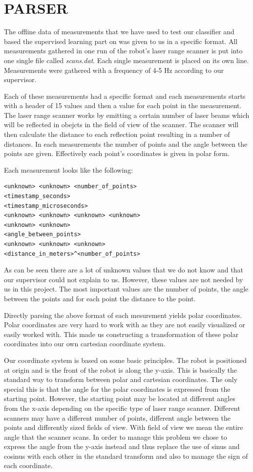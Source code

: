 \documentclass[a4paper, 10pt, conference]{ieeeconf}      %
\begin{document}
\section{PARSER}
The offline data of measurements that we have used to test our classifier and based the supervised learning part on was given to us in a specific format. All measurements gathered in one run of the robot's laser range scanner is put into one single file called \emph{scans.dat}. Each single measurement is placed on its own line. Measurements were gathered with a frequency of 4-5 Hz according to our supervisor.

Each of these measurements had a specific format and each measurements starts with a header of 15 values and then a value for each point in the measurement. The laser range scanner works by emitting a certain number of laser beams which will be reflected in obejcts in the field of view of the scanner. The scanner will then calculate the distance to each reflection point resulting in a number of distances. In each measurements the number of points and the angle between the points are given. Effectively each point's coordinates is given in polar form.

Each measurement looks like the following:

\begin{verbatim}
<unknown> <unknown> <number_of_points>
<timestamp_seconds> 
<timestamp_microseconds>
<unknown> <unknown> <unknown> <unknown>
<unknown> <unknown> 
<angle_between_points>
<unknown> <unknown> <unknown>
<distance_in_meters>^<number_of_points>
\end{verbatim}

As can be seen there are a lot of unknown values that we do not know and that our supervisor could not explain to us. However, these values are not needed by us in this project. The most important values are the number of points, the angle between the points and for each point the distance to the point.

Directly parsing the above format of each mesurement yields polar coordinates. Polar coordinates are very hard to work with as they are not easily visualized or easily worked with. This made us constructing a transformation of these polar coordinates into our own cartesian coordinate system.

Our coordinate system is based on some basic principles. The robot is positioned at origin and is the front of the robot is along the y-axis. This is basically the standard way to transform between polar and cartesian coordinates. The only special this is that the angle for the polar coordinates is expressed from the starting point. However, the starting point may be located at different angles from the x-axis depending on the specific type of laser range scanner. Different scanners may have a different number of points, different angle between the points and differently sized fields of view. With field of view we mean the entire angle that the scanner scans. In order to manage this problem we chose to express the angle from the y-axis instead and thus replace the use of sinus and cosinus with each other in the standard transform and also to manage the sign of each coordinate.
\end{document}
